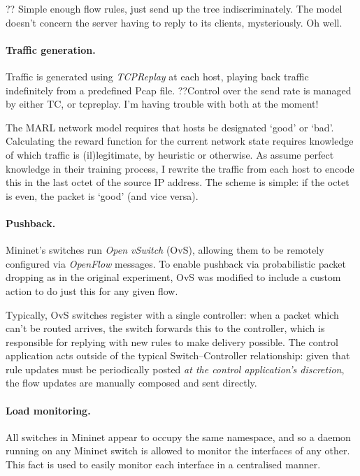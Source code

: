 \documentclass[10pt, a4paper]{article}
\begin{document}
?? Simple enough flow rules, just send up the tree indiscriminately. The model doesn't concern the server having to reply to its clients, mysteriously. Oh well.

\paragraph{Traffic generation.}
Traffic is generated using \emph{TCPReplay} at each host, playing back traffic indefinitely from a predefined Pcap file.
??Control over the send rate is managed by either TC, or tcpreplay. I'm having trouble with both at the moment!

The MARL network model requires that hosts be designated `good' or `bad'.
Calculating the reward function for the current network state requires knowledge of which traffic is (il)legitimate, by heuristic or otherwise.
As \citeauthor{DBLP:journals/eaai/MalialisK15} assume perfect knowledge in their training process, I rewrite the traffic from each host to encode this in the last octet of the source IP address.
The scheme is simple: if the octet is even, the packet is `good' (and vice versa).

\paragraph{Pushback.}
Mininet's switches run \emph{Open vSwitch} (OvS), allowing them to be remotely configured via \emph{OpenFlow} messages.
To enable pushback via probabilistic packet dropping as in the original experiment, OvS was modified to include a custom action to do just this for any given flow.

Typically, OvS switches register with a single controller: when a packet which can't be routed arrives, the switch forwards this to the controller, which is responsible for replying with new rules to make delivery possible.
The control application acts outside of the typical Switch--Controller relationship: given that rule updates must be periodically posted \emph{at the control application's discretion}, the flow updates are manually composed and sent directly.

\paragraph{Load monitoring.}
All switches in Mininet appear to occupy the same namespace, and so a daemon running on any Mininet switch is allowed to monitor the interfaces of any other.
This fact is used to easily monitor each interface in a centralised manner.
\end{document}

